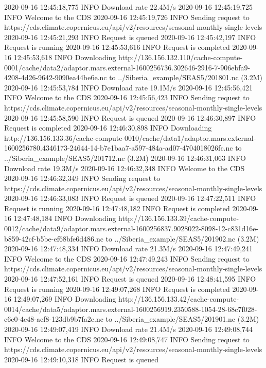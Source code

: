 \documentclass[letterpaper,10pt,english]{sphinxmanual}
\begin{document}
{\begin{sphinxVerbatim}[commandchars=\\\{\}]
2020-09-16 12:45:18,775 INFO Download rate 22.4M/s
2020-09-16 12:45:19,725 INFO Welcome to the CDS
2020-09-16 12:45:19,726 INFO Sending request to https://cds.climate.copernicus.eu/api/v2/resources/seasonal-monthly-single-levels
2020-09-16 12:45:21,293 INFO Request is queued
2020-09-16 12:45:42,197 INFO Request is running
2020-09-16 12:45:53,616 INFO Request is completed
2020-09-16 12:45:53,618 INFO Downloading http://136.156.132.110/cache-compute-0001/cache/data2/adaptor.mars.external-1600256736.302646-2916-7-906ebfa9-4208-4d26-9642-9090ea44be6e.nc to ../Siberia\_example/SEAS5/201801.nc (3.2M)
2020-09-16 12:45:53,784 INFO Download rate 19.1M/s
2020-09-16 12:45:56,421 INFO Welcome to the CDS
2020-09-16 12:45:56,423 INFO Sending request to https://cds.climate.copernicus.eu/api/v2/resources/seasonal-monthly-single-levels
2020-09-16 12:45:58,590 INFO Request is queued
2020-09-16 12:46:30,897 INFO Request is completed
2020-09-16 12:46:30,898 INFO Downloading http://136.156.133.36/cache-compute-0010/cache/data1/adaptor.mars.external-1600256780.4346173-24644-14-b7e1baa7-a597-484a-ad07-4704018026fc.nc to ../Siberia\_example/SEAS5/201712.nc (3.2M)
2020-09-16 12:46:31,063 INFO Download rate 19.3M/s
2020-09-16 12:46:32,348 INFO Welcome to the CDS
2020-09-16 12:46:32,349 INFO Sending request to https://cds.climate.copernicus.eu/api/v2/resources/seasonal-monthly-single-levels
2020-09-16 12:46:33,083 INFO Request is queued
2020-09-16 12:47:22,511 INFO Request is running
2020-09-16 12:47:48,182 INFO Request is completed
2020-09-16 12:47:48,184 INFO Downloading http://136.156.133.39/cache-compute-0012/cache/data9/adaptor.mars.external-1600256837.9028022-8098-12-c831d16e-b859-42cf-b5be-ef68bfe6d486.nc to ../Siberia\_example/SEAS5/201902.nc (3.2M)
2020-09-16 12:47:48,334 INFO Download rate 21.3M/s
2020-09-16 12:47:49,241 INFO Welcome to the CDS
2020-09-16 12:47:49,243 INFO Sending request to https://cds.climate.copernicus.eu/api/v2/resources/seasonal-monthly-single-levels
2020-09-16 12:47:52,161 INFO Request is queued
2020-09-16 12:48:41,595 INFO Request is running
2020-09-16 12:49:07,268 INFO Request is completed
2020-09-16 12:49:07,269 INFO Downloading http://136.156.133.42/cache-compute-0014/cache/data5/adaptor.mars.external-1600256919.2350588-1054-28-68c7f028-c6c0-4e48-acf8-123db9b7fa2e.nc to ../Siberia\_example/SEAS5/201901.nc (3.2M)
2020-09-16 12:49:07,419 INFO Download rate 21.4M/s
2020-09-16 12:49:08,744 INFO Welcome to the CDS
2020-09-16 12:49:08,747 INFO Sending request to https://cds.climate.copernicus.eu/api/v2/resources/seasonal-monthly-single-levels
2020-09-16 12:49:10,318 INFO Request is queued

\end{sphinxVerbatim}}
\end{document}
